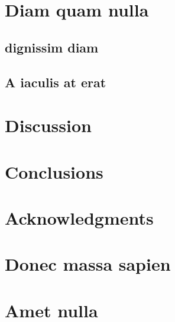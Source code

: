 \documentclass[10pt, a4paper]{article}
\numberwithin{equation}{section}
\begin{document}
\section{Diam quam nulla}

\subsection{dignissim diam}
\subsection{A iaculis at erat}

\section{Discussion}

\section{Conclusions}

\section*{Acknowledgments}

\printbibliography

\appendix
\section{Donec massa sapien}

\section{Amet nulla}
\end{document}
